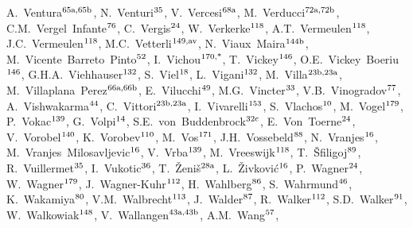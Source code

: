\begin{flushleft}
A.~Ventura$^\textrm{\scriptsize 65a,65b}$,    
N.~Venturi$^\textrm{\scriptsize 35}$,    
V.~Vercesi$^\textrm{\scriptsize 68a}$,    
M.~Verducci$^\textrm{\scriptsize 72a,72b}$,    
C.M.~Vergel~Infante$^\textrm{\scriptsize 76}$,    
C.~Vergis$^\textrm{\scriptsize 24}$,    
W.~Verkerke$^\textrm{\scriptsize 118}$,    
A.T.~Vermeulen$^\textrm{\scriptsize 118}$,    
J.C.~Vermeulen$^\textrm{\scriptsize 118}$,    
M.C.~Vetterli$^\textrm{\scriptsize 149,av}$,    
N.~Viaux~Maira$^\textrm{\scriptsize 144b}$,    
M.~Vicente~Barreto~Pinto$^\textrm{\scriptsize 52}$,    
I.~Vichou$^\textrm{\scriptsize 170,*}$,    
T.~Vickey$^\textrm{\scriptsize 146}$,    
O.E.~Vickey~Boeriu$^\textrm{\scriptsize 146}$,    
G.H.A.~Viehhauser$^\textrm{\scriptsize 132}$,    
S.~Viel$^\textrm{\scriptsize 18}$,    
L.~Vigani$^\textrm{\scriptsize 132}$,    
M.~Villa$^\textrm{\scriptsize 23b,23a}$,    
M.~Villaplana~Perez$^\textrm{\scriptsize 66a,66b}$,    
E.~Vilucchi$^\textrm{\scriptsize 49}$,    
M.G.~Vincter$^\textrm{\scriptsize 33}$,    
V.B.~Vinogradov$^\textrm{\scriptsize 77}$,    
A.~Vishwakarma$^\textrm{\scriptsize 44}$,    
C.~Vittori$^\textrm{\scriptsize 23b,23a}$,    
I.~Vivarelli$^\textrm{\scriptsize 153}$,    
S.~Vlachos$^\textrm{\scriptsize 10}$,    
M.~Vogel$^\textrm{\scriptsize 179}$,    
P.~Vokac$^\textrm{\scriptsize 139}$,    
G.~Volpi$^\textrm{\scriptsize 14}$,    
S.E.~von~Buddenbrock$^\textrm{\scriptsize 32c}$,    
E.~Von~Toerne$^\textrm{\scriptsize 24}$,    
V.~Vorobel$^\textrm{\scriptsize 140}$,    
K.~Vorobev$^\textrm{\scriptsize 110}$,    
M.~Vos$^\textrm{\scriptsize 171}$,    
J.H.~Vossebeld$^\textrm{\scriptsize 88}$,    
N.~Vranjes$^\textrm{\scriptsize 16}$,    
M.~Vranjes~Milosavljevic$^\textrm{\scriptsize 16}$,    
V.~Vrba$^\textrm{\scriptsize 139}$,    
M.~Vreeswijk$^\textrm{\scriptsize 118}$,    
T.~\v{S}filigoj$^\textrm{\scriptsize 89}$,    
R.~Vuillermet$^\textrm{\scriptsize 35}$,    
I.~Vukotic$^\textrm{\scriptsize 36}$,    
T.~\v{Z}eni\v{s}$^\textrm{\scriptsize 28a}$,    
L.~\v{Z}ivkovi\'{c}$^\textrm{\scriptsize 16}$,    
P.~Wagner$^\textrm{\scriptsize 24}$,    
W.~Wagner$^\textrm{\scriptsize 179}$,    
J.~Wagner-Kuhr$^\textrm{\scriptsize 112}$,    
H.~Wahlberg$^\textrm{\scriptsize 86}$,    
S.~Wahrmund$^\textrm{\scriptsize 46}$,    
K.~Wakamiya$^\textrm{\scriptsize 80}$,    
V.M.~Walbrecht$^\textrm{\scriptsize 113}$,    
J.~Walder$^\textrm{\scriptsize 87}$,    
R.~Walker$^\textrm{\scriptsize 112}$,    
S.D.~Walker$^\textrm{\scriptsize 91}$,    
W.~Walkowiak$^\textrm{\scriptsize 148}$,    
V.~Wallangen$^\textrm{\scriptsize 43a,43b}$,    
A.M.~Wang$^\textrm{\scriptsize 57}$,    

\end{flushleft}
